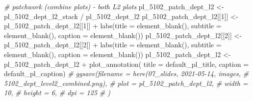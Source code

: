 \documentclass[
]{article}
\newenvironment{Shaded}{\begin{snugshade}}{\end{snugshade}}
\newcommand{\AttributeTok}[1]{\textcolor[rgb]{0.77,0.63,0.00}{#1}}
\newcommand{\CommentTok}[1]{\textcolor[rgb]{0.56,0.35,0.01}{\textit{#1}}}
\newcommand{\DecValTok}[1]{\textcolor[rgb]{0.00,0.00,0.81}{#1}}
\newcommand{\FunctionTok}[1]{\textcolor[rgb]{0.00,0.00,0.00}{#1}}
\newcommand{\NormalTok}[1]{#1}
\newcommand{\OtherTok}[1]{\textcolor[rgb]{0.56,0.35,0.01}{#1}}
\newcommand{\SpecialCharTok}[1]{\textcolor[rgb]{0.00,0.00,0.00}{#1}}
\begin{document}
\begin{Shaded}
\begin{Highlighting}[]
\CommentTok{\# patchwork (combine plots) {-} both L2 plots}
\NormalTok{pl\_5102\_patch\_dept\_l2 }\OtherTok{\textless{}{-}}\NormalTok{ pl\_5102\_dept\_l2\_stack }\SpecialCharTok{/}\NormalTok{ pl\_5102\_dept\_l2}
\NormalTok{pl\_5102\_patch\_dept\_l2[[}\DecValTok{1}\NormalTok{]] }\OtherTok{\textless{}{-}}\NormalTok{ pl\_5102\_patch\_dept\_l2[[}\DecValTok{1}\NormalTok{]] }\SpecialCharTok{+} 
    \FunctionTok{labs}\NormalTok{(}\AttributeTok{title =} \FunctionTok{element\_blank}\NormalTok{(),}
         \AttributeTok{subtitle =} \FunctionTok{element\_blank}\NormalTok{(),}
         \AttributeTok{caption =} \FunctionTok{element\_blank}\NormalTok{())}
\NormalTok{pl\_5102\_patch\_dept\_l2[[}\DecValTok{2}\NormalTok{]] }\OtherTok{\textless{}{-}}\NormalTok{ pl\_5102\_patch\_dept\_l2[[}\DecValTok{2}\NormalTok{]] }\SpecialCharTok{+} 
    \FunctionTok{labs}\NormalTok{(}\AttributeTok{title =} \FunctionTok{element\_blank}\NormalTok{(),}
         \AttributeTok{subtitle =} \FunctionTok{element\_blank}\NormalTok{(),}
         \AttributeTok{caption =} \FunctionTok{element\_blank}\NormalTok{())}
\NormalTok{pl\_5102\_patch\_dept\_l2 }\OtherTok{\textless{}{-}}\NormalTok{ pl\_5102\_patch\_dept\_l2 }\SpecialCharTok{+} 
    \FunctionTok{plot\_annotation}\NormalTok{(}
        \AttributeTok{title =}\NormalTok{ default\_pl\_title,}
        \AttributeTok{caption =}\NormalTok{ default\_pl\_caption)}
\CommentTok{\# ggsave(filename = here(\textquotesingle{}07\_slides\textquotesingle{}, \textquotesingle{}2021{-}05{-}14\textquotesingle{}, \textquotesingle{}images\textquotesingle{}, }
\CommentTok{\#                        \textquotesingle{}5102\_dept\_level2\_combined.png\textquotesingle{}), }
\CommentTok{\#        plot = pl\_5102\_patch\_dept\_l2, }
\CommentTok{\#        width = 10, }
\CommentTok{\#        height = 6, }
\CommentTok{\#        dpi = 125}
\CommentTok{\#        )}
\end{Highlighting}
\end{Shaded}
\end{document}
